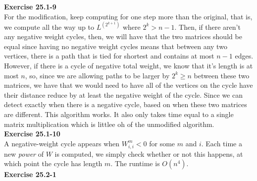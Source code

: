 \documentclass{article}
\begin{document}
\noindent\textbf{Exercise 25.1-9}\\

For the modification, keep computing for one step more than the original, that is, we compute all the way up to $L^{(2^{k+1})}$ where $2^{k} >n-1$. Then, if there aren't any negative weight cycles, then, we will have that the two matrices should be equal since having no negative weight cycles means that between any two vertices, there is a path that is tied for shortest and contains at most $n-1$ edges. However, if there is a cycle of negative total weight, we know that it's length is at most $n$, so, since we are allowing paths to be larger by $2^k\ge n$ between these two matrices, we have that we would need to have all of the vertices on the cycle have their distance reduce by at least the negative weight of the cycle. Since we can detect exactly when there is a negative cycle, based on when these two matrices are different. This algorithm works. It also only takes time equal to a single matrix multiplication which is littlee oh of the unmodified algorithm.\\

\noindent\textbf{Exercise 25.1-10}\\

A negative-weight cycle appears when $W^m_{i,i} < 0$ for some $m$ and $i$.  Each time a new \emph{power} of $W$ is computed, we simply check whether or not this happens, at which point the cycle has length $m$.  The runtime is $O(n^4)$. \\

\noindent\textbf{Exercise 25.2-1}\\
\end{document}
